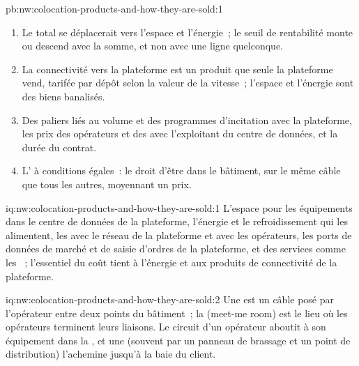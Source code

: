\begin{solution}{pb:nw:colocation-products-and-how-they-are-sold:1}
\begin{enumerate}
\item Le total se déplacerait vers l'espace et l'énergie~; le seuil de rentabilité monte ou descend avec la somme, et non avec une ligne quelconque.
\item La connectivité vers la plateforme est un produit que seule la plateforme vend, tarifée par dépôt selon la valeur de la vitesse~; l'espace et l'énergie sont des biens banalisés.
\item Des paliers liés au volume et des programmes d'incitation avec la plateforme, les prix des opérateurs et des  avec l'exploitant du centre de données, et la
  durée du contrat.
\item L' à conditions égales~: le droit d'être dans le bâtiment, sur le même câble que tous les autres, moyennant un prix.
\end{enumerate}
\end{solution}

\begin{solution}{iq:nw:colocation-products-and-how-they-are-sold:1}
L'espace pour les équipements dans le centre de données de la plateforme, l'énergie et le refroidissement qui les alimentent, les  avec le réseau de la plateforme et avec les opérateurs, les
ports de données de marché et de saisie d'ordres de la plateforme, et des services comme les ~; l'essentiel du coût tient à l'énergie et aux produits de connectivité de la plateforme.
\end{solution}

\begin{solution}{iq:nw:colocation-products-and-how-they-are-sold:2}
Une  est un câble posé par l'opérateur entre deux points du bâtiment~; la  (meet-me room) est le lieu où les opérateurs terminent leurs liaisons. Le circuit d'un opérateur
aboutit à son équipement dans la , et une  (souvent par un panneau de brassage et un point de distribution) l'achemine
jusqu'à la baie du client.
\end{solution}


